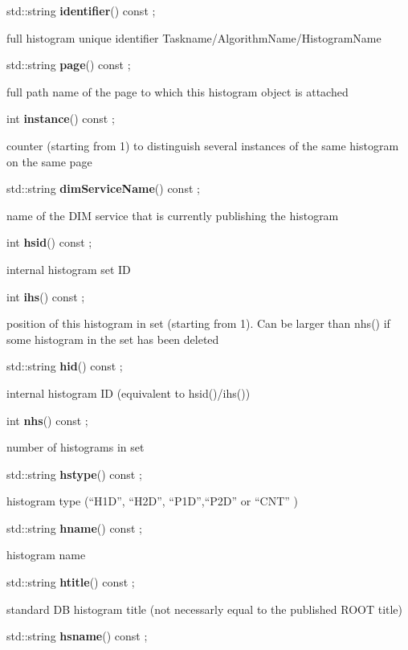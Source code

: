 \item    std::string {\bf identifier}() const ;

 full histogram unique identifier Taskname/AlgorithmName/HistogramName


\item    std::string {\bf page}() const ;

 full path name of the page to which this histogram object is attached


\item    int {\bf instance}() const ;

 counter (starting from 1) to distinguish several instances of the same histogram on the same page


\item    std::string {\bf dimServiceName}() const  ;

 name of the DIM service that is currently publishing the histogram


\item    int {\bf hsid}() const ;

 internal histogram set ID


\item    int {\bf ihs}() const ;

 position of this histogram in set (starting from 1). Can be larger than nhs() if some histogram in the set has been deleted


\item    std::string {\bf hid}() const ;

 internal histogram ID (equivalent to hsid()/ihs())


\item    int {\bf nhs}() const ;

 number of histograms in set


\item    std::string {\bf hstype}() const ;

 histogram type (``H1D'', ``H2D'', ``P1D'',``P2D'' or ``CNT'' )


\item    std::string {\bf hname}() const ;

 histogram name


\item    std::string {\bf htitle}() const ;

 standard DB histogram title (not necessarly equal to the published ROOT title)


\item    std::string {\bf hsname}() const ;

